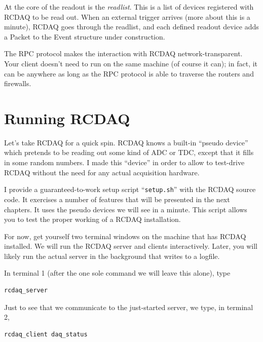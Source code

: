 \documentclass{article}[11pt]
\begin{document}
At the core of the readout is the \emph{readlist}. This is a list of
devices registered with RCDAQ to be read out. When an external trigger
arrives (more about this is a minute), RCDAQ goes through the
readlist, and each defined readout device adds a Packet to the Event
structure under construction.

The RPC protocol makes the interaction with RCDAQ
network-transparent. Your client doesn't need to run on the same
machine (of course it can); in fact, it can be anywhere as long as
the RPC protocol is able to traverse the routers and firewalls. 


\section{Running RCDAQ}
\label{running}

Let's take RCDAQ for a quick spin. RCDAQ knows a built-in ``pseudo
device'' which pretends to be reading out some kind of ADC or TDC,
except that it fills in some random numbers. I made this ``device'' in
order to allow to test-drive RCDAQ without the need for any actual
acquisition hardware.

\vskip 3mm
\begin{minipage}[c]{0.1\linewidth}
{\Huge{}}
\end{minipage}
\begin{minipage}[c]{0.9\linewidth}
I provide a guaranteed-to-work setup script ``\verb|setup.sh|'' with
the RCDAQ source code. It exercises a number of features that will be
presented in the next chapters. It uses the pseudo devices we will see
in a minute. This script allows you to test the proper working of a
RCDAQ installation.
\end{minipage}
\vskip 3mm


For now, get yourself two terminal windows on the machine that has
RCDAQ installed. We will run the RCDAQ server and clients
interactively. Later, you will likely run the actual server in the
background that writes to a logfile.

In terminal 1 (after the one sole command we will leave this alone), type
\begin{verbatim}
rcdaq_server 
\end{verbatim}

Just to see that we communicate to the just-started server, we type,
in terminal 2,
\begin{verbatim}
rcdaq_client daq_status 
\end{verbatim}
\end{document}
